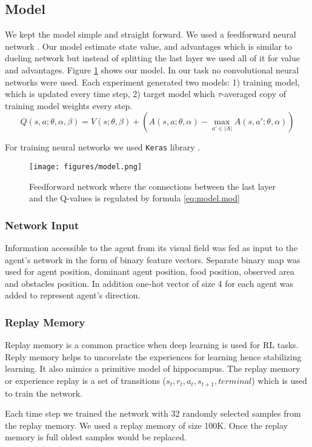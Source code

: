 \documentclass{article}
\begin{document}
\subsection{Model}
We kept the model simple and straight forward. We used a feedforward neural network \cite{Goodfellow-et-al-2016}. Our model estimate state value, and advantages which is similar to dueling network \cite{DBLP:journals/corr/WangFL15} but instead of splitting the last layer we used all of it for value and advantages. Figure \ref{fig.model} shows our model. In our task no convolutional neural networks were used. Each experiment generated two models: 1) training model, which is updated every time step, 2) target model which $\tau$-averaged copy of training model weights every step.
  \begin{equation} \label{eq:model.mod}
    Q(s,a;\theta,\alpha,\beta) = V(s;\theta,\beta) +\left( A(s,a;\theta,\alpha) - \underset{a' \in |A|}{\max}A(s,a';\theta,\alpha) \right)
  \end{equation}
\par For training neural networks we used \texttt{Keras} library \cite{chollet2015keras}.
\begin{figure}[!ht]
\begin{center}
\texttt{[image: figures/model.png]}
\caption{Feedforward network where the connections between the last layer and the Q-values is regulated by formula \ref{eq:model.mod}}
\label{fig.model}
\end{center}
\end{figure}

\subsubsection{Network Input}
Information accessible to the agent from its visual field was fed as input to the agent's network in the form of binary feature vectors. Separate binary map was used for agent position, dominant agent position, food position, observed area and obstacles position. In addition one-hot vector of size 4 for each agent was added to represent agent's direction.
\subsubsection{Replay Memory}
Replay memory is a common practice when deep learning is used for RL tasks\cite{DBLP:journals/corr/WangFL15,mnih2015human,mnih2013playing}.
Reply memory helps to uncorelate the experiences for learning hence stabilizing learning. It also mimics a primitive model of hippocampus.
The replay memory or experience replay is a set of transitions (\(s_t,r_t,a_t,s_{t+1},terminal\)) which is used to train the network.  \par Each time step we trained the network with 32 randomly selected samples from the replay memory. We used a replay memory of size 100K. Once the replay memory is full oldest samples would be replaced.
\end{document}
